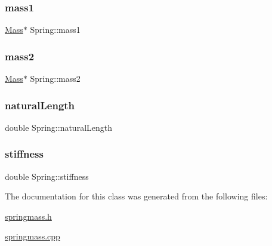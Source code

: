 \mbox{\label{classSpring_ab89136b001acfb27f95271781651c7f2}} 
\subsubsection{\texorpdfstring{mass1}{mass1}}
{\footnotesize\ttfamily \hyperlink{classMass}{Mass}$\ast$ Spring\+::mass1\hspace{0.3cm}{\ttfamily [protected]}}

\mbox{\label{classSpring_af687f55d26b9799e7d7348104843855c}} 
\subsubsection{\texorpdfstring{mass2}{mass2}}
{\footnotesize\ttfamily \hyperlink{classMass}{Mass}$\ast$ Spring\+::mass2\hspace{0.3cm}{\ttfamily [protected]}}

\mbox{\label{classSpring_a2b0a17c4655fda4b082289f5ff867197}} 
\subsubsection{\texorpdfstring{natural\+Length}{naturalLength}}
{\footnotesize\ttfamily double Spring\+::natural\+Length\hspace{0.3cm}{\ttfamily [protected]}}

\mbox{\label{classSpring_aed22a149191c40dcef27af3e029e60fd}} 
\subsubsection{\texorpdfstring{stiffness}{stiffness}}
{\footnotesize\ttfamily double Spring\+::stiffness\hspace{0.3cm}{\ttfamily [protected]}}



The documentation for this class was generated from the following files\+:\begin{DoxyCompactItemize}
\item 
\hyperlink{springmass_8h}{springmass.\+h}\item 
\hyperlink{springmass_8cpp}{springmass.\+cpp}\end{DoxyCompactItemize}
